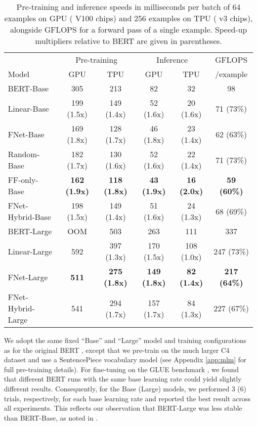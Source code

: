 \documentclass[11pt]{article}
\begin{document}
\begin{table*}[tb]
    \caption{Pre-training and inference speeds in milliseconds per batch of 64 examples on GPU ( V100 chips) and 256 examples on TPU ( v3 chips), alongside GFLOPS for a forward pass of a single example. Speed-up multipliers relative to BERT are given in parentheses.}
    \label{tab:pretrain_speed}
    \centering
    \begin{tabular}{l | c c | c c | c}
        \hline
         & \multicolumn{2}{c|}{Pre-training} & \multicolumn{2}{c|}{Inference} & GFLOPS  \\  
         Model & GPU & TPU & GPU & TPU & /example \\ \hline \hline
         BERT-Base & 305 & 213 & 82  & 32 & 98 \\
         Linear-Base & 199 (1.5x) & 149 (1.4x) & 52 (1.6x)  & 20 (1.6x) & 71 (73\%) \\
         FNet-Base & 169 (1.8x) & 128 (1.7x) & 46 (1.8x) & 23 (1.4x) & 62 (63\%) \\
         Random-Base & 182 (1.7x) & 130 (1.6x) & 52 (1.6x) & 22 (1.4x) & 71 (73\%) \\
         FF-only-Base & \textbf{162 (1.9x)} & \textbf{118 (1.8x)} & \textbf{43 (1.9x)} & \textbf{16 (2.0x)} & \textbf{59 (60\%)} \\
         FNet-Hybrid-Base & 198 (1.5x) & 149 (1.4x) & 51 (1.6x) & 24 (1.3x) & 68 (69\%) \\ \hline
         BERT-Large & OOM & 503 & 263 & 111 & 337 \\
         Linear-Large & 592 & 397 (1.3x) & 170 (1.5x) & 108 (1.0x) & 247 (73\%) \\
         FNet-Large & \textbf{511} & \textbf{275 (1.8x)} & \textbf{149 (1.8x)} & \textbf{82 (1.4x)} & \textbf{217 (64\%)} \\ 
         FNet-Hybrid-Large & 541 & 294 (1.7x) & 157 (1.7x) & 84 (1.3x) & 227 (67\%)\\ \hline
    \end{tabular}
\end{table*}

We adopt the same fixed ``Base'' and ``Large'' model and training configurations as for the original BERT \citep{devlin2018bert}, except that we pre-train on the much larger C4 dataset \citep{raffel2019exploring} and use a  SentencePiece vocabulary model \citep{kudo2018sentencepiece} (see Appendix \ref{app:mlm} for full pre-training details). For fine-tuning on the GLUE benchmark \citep{wang2018glue}, we found that different BERT runs with the same base learning rate could yield slightly different results. Consequently, for the Base (Large) models, we performed 3 (6) trials, respectively, for each base learning rate and reported the best result across all experiments. This reflects our observation that BERT-Large was less stable than BERT-Base, as noted in \citet{devlin2018bert}.
\end{document}
